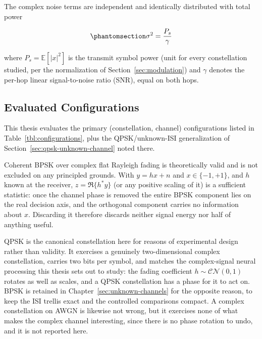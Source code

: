 The complex noise terms are independent and identically distributed with total power

\begin{equation}\protect\phantomsection\label{eq:awgn-sigma2}
\sigma^2 = \frac{P_s}{\gamma}
\end{equation}

where \(P_s = \mathbb{E}[|x|^2]\) is the transmit symbol power (unit for every constellation studied, per the normalization of Section~\ref{sec:modulation}) and \(\gamma\) denotes the per-hop linear signal-to-noise ratio (SNR), equal on both hops.

\subsection{Evaluated Configurations}\label{sec:evaluated-configurations}

This thesis evaluates the primary (constellation, channel) configurations listed in Table~\ref{tbl:configurations}, plus the QPSK/unknown-ISI generalization of Section~\ref{sec:qpsk-unknown-channel} noted there.

Coherent BPSK over complex flat Rayleigh fading is theoretically valid and is not excluded on any principled grounds. With \(y = hx + n\) and \(x \in \{-1,+1\}\), and \(h\) known at the receiver, \(z = \Re\{h^{*}y\}\) (or any positive scaling of it) is a sufficient statistic: once the channel phase is removed the entire BPSK component lies on the real decision axis, and the orthogonal component carries no information about \(x\). Discarding it therefore discards neither signal energy nor half of anything useful.

QPSK is the canonical constellation here for reasons of experimental design rather than validity. It exercises a genuinely two-dimensional complex constellation, carries two bits per symbol, and matches the complex-signal neural processing this thesis sets out to study: the fading coefficient \(h \sim \mathcal{CN}(0,1)\) rotates as well as scales, and a QPSK constellation has a phase for it to act on. BPSK is retained in Chapter~\ref{sec:unknown-channels} for the opposite reason, to keep the ISI trellis exact and the controlled comparisons compact. A complex constellation on AWGN is likewise not wrong, but it exercises none of what makes the complex channel interesting, since there is no phase rotation to undo, and it is not reported here.

